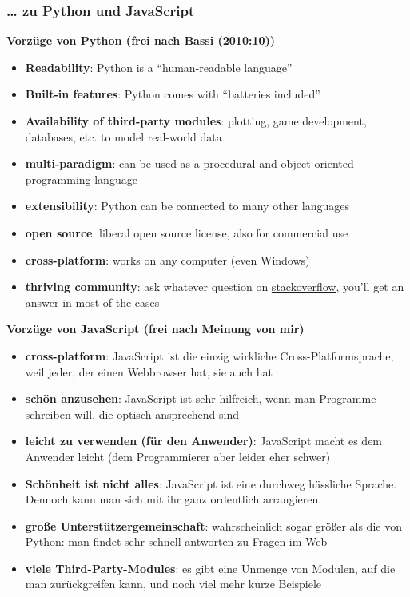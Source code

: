 \subsubsection{\texorpdfstring{{\ldots{} zu Python und
JavaScript}}{\ldots{} zu Python und JavaScript}}

\par\noindent\textbf{Vorzüge von Python (frei nach
\href{http://bibliography.lingpy.org?key=Bassi2010}{Bassi (2010:10)})}

\begin{itemize}
\itemsep1pt\parskip0pt
\item
  \textbf{Readability}: Python is a ``human-readable language''
\item
  \textbf{Built-in features}: Python comes with ``batteries included''
\item
  \textbf{Availability of third-party modules}: plotting, game
  development, databases, etc. to model real-world data
\item
  \textbf{multi-paradigm}: can be used as a procedural and
  object-oriented programming language
\item
  \textbf{extensibility}: Python can be connected to many other
  languages
\item
  \textbf{open source}: liberal open source license, also for commercial
  use
\item
  \textbf{cross-platform}: works on any computer (even Windows)
\item
  \textbf{thriving community}: ask whatever question on
  \href{http://stackoverflow.com}{stackoverflow}, you'll get an answer
  in most of the cases
\end{itemize}



\par\noindent\textbf{Vorzüge von JavaScript (frei nach Meinung von mir)}

\begin{itemize}
\itemsep1pt\parskip0pt
\item
  \textbf{cross-platform}: JavaScript ist die einzig wirkliche
  Cross-Platformsprache, weil jeder, der einen Webbrowser hat, sie auch
  hat
\item
  \textbf{schön anzusehen}: JavaScript ist sehr hilfreich, wenn man
  Programme schreiben will, die optisch ansprechend sind
\item
  \textbf{leicht zu verwenden (für den Anwender)}: JavaScript macht es
  dem Anwender leicht (dem Programmierer aber leider eher schwer)
\item
  \textbf{Schönheit ist nicht alles}: JavaScript ist eine durchweg
  hässliche Sprache. Dennoch kann man sich mit ihr ganz ordentlich
  arrangieren.
\item
  \textbf{große Unterstützergemeinschaft}: wahrscheinlich sogar größer
  als die von Python: man findet sehr schnell antworten zu Fragen im Web
\item
  \textbf{viele Third-Party-Modules}: es gibt eine Unmenge von Modulen,
  auf die man zurückgreifen kann, und noch viel mehr kurze Beispiele
\end{itemize}



